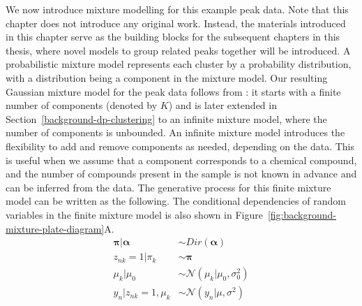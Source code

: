 We now introduce mixture modelling for this example peak data. Note that this chapter does not introduce any original work. Instead, the materials introduced in this chapter serve as the building blocks for the subsequent chapters in this thesis, where novel models to group related peaks together will be introduced. A probabilistic mixture model represents each cluster by a probability distribution, with a distribution being a component in the mixture model. Our resulting Gaussian mixture model for the peak data follows from \cite{Rasmussen2000}: it starts with a finite number of components (denoted by $K$) and is later extended in Section~\ref{background-dp-clustering} to an infinite mixture model, where the number of components is unbounded. An infinite mixture model introduces the flexibility to add and remove components as needed, depending on the data. This is useful when we assume that a component corresponds to a chemical compound, and the number of compounds present in the sample is not known in advance and can be inferred from the data. The generative process for this finite mixture model can be written as the following. The conditional dependencies of random variables in the finite mixture model is also shown in Figure~\ref{fig:background-mixture-plate-diagram}A. 
\begin{equation}
\begin{aligned}
\boldsymbol{\pi} \vert \boldsymbol{\alpha} &\sim Dir(\boldsymbol{\alpha}) \\
z_{nk}=1 \vert \pi_k                                  &\sim \boldsymbol{\pi} \\
\mu_k \vert \mu_0                                    &\sim \mathcal{N}(\mu_k \vert \mu_0, \sigma_0^2) \\
y_n \vert z_{nk}=1, \mu_k                         &\sim \mathcal{N}(y_n \vert \mu, \sigma^2)
\end{aligned}
\label{eq:background-finite-mixture}
\end{equation}

